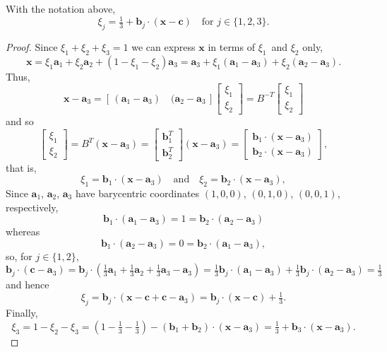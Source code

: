 \begin{theorem}\label{thm: barycentric}
With the notation above,
\[
\xi_j=\tfrac13+\boldsymbol{b}_j\cdot(\boldsymbol{x}-\boldsymbol{c})
\quad\text{for $j\in\{1,2,3\}$.}
\]
\end{theorem}
\begin{proof}
Since $\xi_1+\xi_2+\xi_3=1$ we can express $\boldsymbol{x}$ in terms of 
$\xi_1$~and $\xi_2$ only,
\[
\boldsymbol{x}=\xi_1\boldsymbol{a}_1+\xi_2\boldsymbol{a}_2
    +(1-\xi_1-\xi_2)\boldsymbol{a}_3
    =\boldsymbol{a}_3+\xi_1(\boldsymbol{a}_1-\boldsymbol{a}_3)
    +\xi_2(\boldsymbol{a}_2-\boldsymbol{a}_3).
\]
Thus,
\[
\boldsymbol{x}-\boldsymbol{a}_3
=[\,(\boldsymbol{a}_1-\boldsymbol{a}_3)\quad
    (\boldsymbol{a}_2-\boldsymbol{a}_3\,]
\begin{bmatrix}\xi_1\\ \xi_2 \end{bmatrix}
=B^{-T}\begin{bmatrix}\xi_1\\ \xi_2 \end{bmatrix}
\]
and so
\[
\begin{bmatrix}\xi_1\\ \xi_2 \end{bmatrix}=B^T(\boldsymbol{x}-\boldsymbol{a}_3)
=\begin{bmatrix}\boldsymbol{b}_1^T\\ \boldsymbol{b}_2^T\end{bmatrix}
    (\boldsymbol{x}-\boldsymbol{a}_3)
=\begin{bmatrix}\boldsymbol{b}_1\cdot(\boldsymbol{x}-\boldsymbol{a}_3)\\
\boldsymbol{b}_2\cdot(\boldsymbol{x}-\boldsymbol{a}_3)\end{bmatrix},
\]
that is,
\[
\xi_1=\boldsymbol{b}_1\cdot(\boldsymbol{x}-\boldsymbol{a}_3)
\quad\text{and}\quad
\xi_2=\boldsymbol{b}_2\cdot(\boldsymbol{x}-\boldsymbol{a}_3),
\]
Since $\boldsymbol{a}_1$, $\boldsymbol{a}_2$, $\boldsymbol{a}_3$ have
barycentric coordinates $(1,0,0)$, $(0,1,0)$, $(0,0,1)$, respectively,
\[
\boldsymbol{b}_1\cdot(\boldsymbol{a}_1-\boldsymbol{a}_3)
=1=\boldsymbol{b}_2\cdot(\boldsymbol{a}_2-\boldsymbol{a}_3)
\]
whereas
\[
\boldsymbol{b}_1\cdot(\boldsymbol{a}_2-\boldsymbol{a}_3)
=0=\boldsymbol{b}_2\cdot(\boldsymbol{a}_1-\boldsymbol{a}_3),
\]
so, for $j\in\{1,2\}$,
\[
\boldsymbol{b}_j\cdot(\boldsymbol{c}-\boldsymbol{a}_3)
    =\boldsymbol{b}_j\cdot(
\tfrac13\boldsymbol{a}_1+\tfrac13\boldsymbol{a}_2+\tfrac13\boldsymbol{a}_3
    -\boldsymbol{a}_3)
    =\tfrac13\boldsymbol{b}_j\cdot(\boldsymbol{a}_1-\boldsymbol{a}_3)
    +\tfrac13\boldsymbol{b}_j\cdot(\boldsymbol{a}_2-\boldsymbol{a}_3)
    =\tfrac13
\]
and hence
\[
\xi_j=\boldsymbol{b}_j\cdot(
    \boldsymbol{x}-\boldsymbol{c}+\boldsymbol{c}-\boldsymbol{a}_3)
    =\boldsymbol{b}_j\cdot(\boldsymbol{x}-\boldsymbol{c})+\tfrac13.
\]
Finally,
\[
\xi_3=1-\xi_2-\xi_3=(1-\tfrac13-\tfrac13)
    -(\boldsymbol{b}_1+\boldsymbol{b}_2)\cdot
    (\boldsymbol{x}-\boldsymbol{a}_3)
    =\tfrac13+\boldsymbol{b}_3\cdot(\boldsymbol{x}-\boldsymbol{a}_3).
\]
\end{proof}

